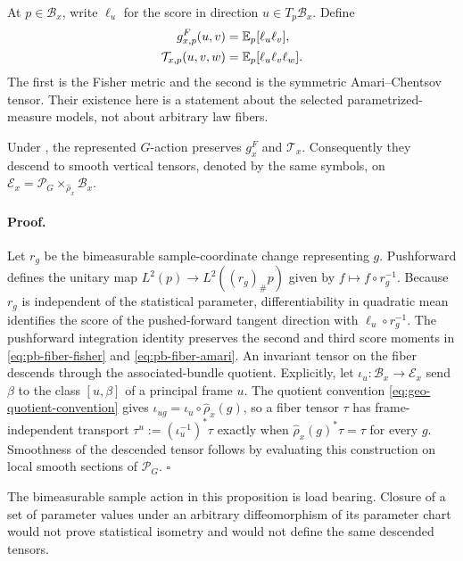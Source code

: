 At $p\in\mathcal B_x$, write $\ell_u$ for the score in direction
$u\in T_p\mathcal B_x$.  Define
\begin{align}
g^F_{x,p}(u,v)
&=\mathbb E_p[\ell_u\ell_v],
\label{eq:pb-fiber-fisher}\\
\mathcal T_{x,p}(u,v,w)
&=\mathbb E_p[\ell_u\ell_v\ell_w].
\label{eq:pb-fiber-amari}
\end{align}
The first is the Fisher metric and the second is the symmetric
Amari--Chentsov tensor.  Their existence here is a statement about the
selected parametrized-measure models, not about arbitrary law fibers.

Under , the represented $G$-action
preserves $g_x^F$ and $\mathcal T_x$.  Consequently they descend to smooth
vertical tensors, denoted by the same symbols, on
$\mathcal E_x=\mathscr P_G\times_{\widehat\rho_x}\mathcal B_x$.  

\paragraph{Proof.}
Let $r_g$ be the bimeasurable sample-coordinate change representing $g$.
Pushforward defines the unitary map
$L^2(p)\to L^2((r_g)_\#p)$ given by
$f\mapsto f\circ r_g^{-1}$.  Because $r_g$ is independent of the statistical
parameter, differentiability in quadratic mean identifies the score of the
pushed-forward tangent direction with $\ell_u\circ r_g^{-1}$.  The
pushforward integration identity preserves the second and third score moments in
\eqref{eq:pb-fiber-fisher} and \eqref{eq:pb-fiber-amari}.  An invariant tensor
on the fiber descends through the associated-bundle quotient.  Explicitly, let
$\iota_u:\mathcal B_x\to\mathcal E_x$ send $\beta$ to the class $[u,\beta]$ of
a principal frame $u$.  The quotient convention
\eqref{eq:geo-quotient-convention} gives
$\iota_{ug}=\iota_u\circ\widehat\rho_x(g)$, so a fiber tensor $\tau$ has
frame-independent transport $\tau^u:=(\iota_u^{-1})^*\tau$ exactly when
$\widehat\rho_x(g)^*\tau=\tau$ for every $g$.  Smoothness of the descended
tensor follows by evaluating this construction on local smooth sections of
$\mathscr P_G$.  $\square$

The bimeasurable sample action in this proposition is load bearing.  Closure
of a set of parameter values under an arbitrary diffeomorphism of its
parameter chart would not prove statistical isometry and would not define the
same descended tensors.  

